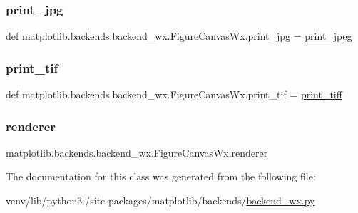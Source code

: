 \subsubsection{\texorpdfstring{print\+\_\+jpg}{print\_jpg}}
{\footnotesize\ttfamily def matplotlib.\+backends.\+backend\+\_\+wx.\+Figure\+Canvas\+Wx.\+print\+\_\+jpg = \hyperlink{classmatplotlib_1_1backends_1_1backend__wx_1_1FigureCanvasWx_a741541d3aceebd35aa9d2f98414aa883}{print\+\_\+jpeg}\hspace{0.3cm}{\ttfamily [static]}}

\mbox{\label{classmatplotlib_1_1backends_1_1backend__wx_1_1FigureCanvasWx_a77cd824b92569445e18bde88ac030215}} 
\subsubsection{\texorpdfstring{print\+\_\+tif}{print\_tif}}
{\footnotesize\ttfamily def matplotlib.\+backends.\+backend\+\_\+wx.\+Figure\+Canvas\+Wx.\+print\+\_\+tif = \hyperlink{classmatplotlib_1_1backends_1_1backend__wx_1_1FigureCanvasWx_afea2030c3d201024e4da4b4c7213af2a}{print\+\_\+tiff}\hspace{0.3cm}{\ttfamily [static]}}

\mbox{\label{classmatplotlib_1_1backends_1_1backend__wx_1_1FigureCanvasWx_aae305e89b6dcb07bdc7869d17202d930}} 
\subsubsection{\texorpdfstring{renderer}{renderer}}
{\footnotesize\ttfamily matplotlib.\+backends.\+backend\+\_\+wx.\+Figure\+Canvas\+Wx.\+renderer}



The documentation for this class was generated from the following file\+:\begin{DoxyCompactItemize}
\item 
venv/lib/python3./site-\/packages/matplotlib/backends/\hyperlink{backend__wx_8py}{backend\+\_\+wx.\+py}\end{DoxyCompactItemize}
